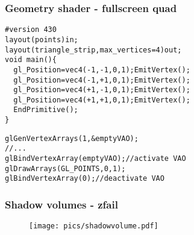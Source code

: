 \begin{frame}[fragile]
\frametitle{Geometry shader - fullscreen quad}
{\scriptsize
\begin{verbatim}
#version 430
layout(points)in;
layout(triangle_strip,max_vertices=4)out;
void main(){
  gl_Position=vec4(-1,-1,0,1);EmitVertex();
  gl_Position=vec4(-1,+1,0,1);EmitVertex();
  gl_Position=vec4(+1,-1,0,1);EmitVertex();
  gl_Position=vec4(+1,+1,0,1);EmitVertex();
  EndPrimitive();
}
\end{verbatim}
}
{\scriptsize
\begin{verbatim}
glGenVertexArrays(1,&emptyVAO);
//...
glBindVertexArray(emptyVAO);//activate VAO
glDrawArrays(GL_POINTS,0,1);
glBindVertexArray(0);//deactivate VAO
\end{verbatim}
}
\end{frame}

\begin{frame}[fragile]
\frametitle{Shadow volumes - zfail}
  \begin{figure}[h]
    \texttt{[image: pics/shadowvolume.pdf]}
  \end{figure}
\end{frame}

